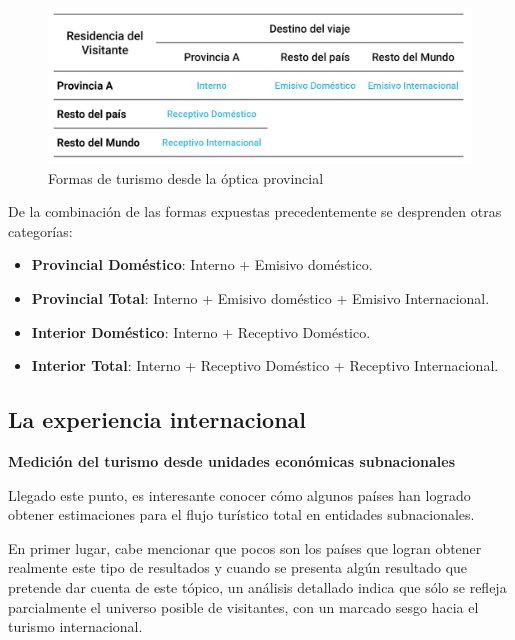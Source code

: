 \documentclass[
]{book}
\begin{document}
\begin{figure}

{\centering \includegraphics[width=0.8\linewidth]{imagenes/figura1.6} 

}

\caption{Formas de turismo desde la óptica provincial}\label{fig:formasturismo}
\end{figure}

De la combinación de las formas expuestas precedentemente se desprenden otras categorías:

\begin{itemize}
\item
  \textbf{Provincial Doméstico}: Interno + Emisivo doméstico.
\item
  \textbf{Provincial Total}: Interno + Emisivo doméstico + Emisivo Internacional.
\item
  \textbf{Interior Doméstico}: Interno + Receptivo Doméstico.
\item
  \textbf{Interior Total}: Interno + Receptivo Doméstico + Receptivo Internacional.
\end{itemize}

\hypertarget{la-experiencia-internacional}{%
\subsection{La experiencia internacional}\label{la-experiencia-internacional}}

\textbf{Medición del turismo desde unidades económicas subnacionales}

Llegado este punto, es interesante conocer cómo algunos países han logrado obtener estimaciones para el flujo turístico total en entidades subnacionales.

En primer lugar, cabe mencionar que pocos son los países que logran obtener realmente este tipo de resultados y cuando se presenta algún resultado que pretende dar cuenta de este tópico, un análisis detallado indica que sólo se refleja parcialmente el universo posible de visitantes, con un marcado sesgo hacia el turismo internacional.
\end{document}
